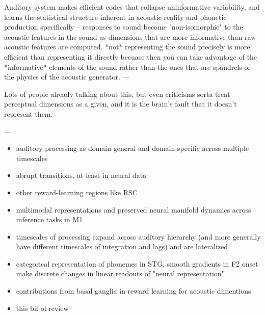 Auditory system makes efficient codes that collapse uninformative variability, and learns the statistical structure inherent in acoustic reality \cite{schiavoCapacitiesNeuralMechanisms2019} and phonetic production specifically\cite{kuhlNewViewLanguage2000} -- responses to sound become "non-isomorphic" to the acoustic features in the sound \cite{stilpEfficientCodingStatistically2012,wangNeuralCodingStrategies2007} as dimensions that are more informative than raw acoustic features are computed. *not* representing the sound precisely is more efficient than representing it directly becuase then you can take advantage of the *informative* elements of the sound rather than the ones that are spandrels of the physics of the acoustic generator.
---


Lots of people already talking about this, but even criticisms sorta treat perceptual dimensions as a given, and it is the brain's fault that it doesn't represent them. \cite{goddardInterpretingDimensionsNeural2018a}

---


\begin{itemize}
\item auditory processing as domain-general and domain-specific across multiple timescales \cite{norman-haignereHierarchicalIntegrationMultiple2020}
\item abrupt transitions, at least in neural data \cite{durstewitzAbruptTransitionsPrefrontal2010}
\item other reward-learning regions like RSC \cite{millerRetrosplenialCorticalRepresentations2019}
\item multimodal representations and preserved neural manifold dynamics across inference tasks in M1 \cite{gallegoCorticalPopulationActivity2018}
\item timescales of processing expand across auditory hierarchy (and more generally have different timescales of integration and lags) \cite{norman-haignereHierarchicalIntegrationMultiple2020} and are lateralized \cite{levyCircuitAsymmetriesUnderlie2019a}
\item categorical representation of phonemes in STG, smooth gradients in F2 onset make discrete changes in linear readouts of "neural representation" \cite{changCategoricalSpeechRepresentation2010b}
\item contributions from basal ganglia in reward learning for acoustic dimentions \cite{limHowMayBasal2014}
\item this bif ol review \cite{rauscheckerMapsStreamsAuditory2009b}
\end{itemize}

